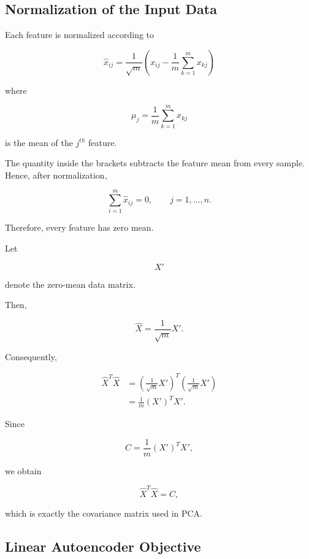 \documentclass{article}
\begin{document}
\subsection{Normalization of the Input Data}

Each feature is normalized according to

\[
\boxed{
	\hat{x}_{ij}
	=
	\frac{1}{\sqrt{m}}
	\left(
	x_{ij}
	-
	\frac1m
	\sum_{k=1}^{m}x_{kj}
	\right)
}
\]

where

\[
\mu_j
=
\frac1m
\sum_{k=1}^{m}x_{kj}
\]

is the mean of the $j^{th}$ feature.

The quantity inside the brackets subtracts the feature mean from every sample.
Hence, after normalization,

\[
\boxed{
	\sum_{i=1}^{m}\hat{x}_{ij}=0,
	\qquad
	j=1,\ldots,n.
}
\]

Therefore, every feature has zero mean.

Let

\[
X'
\]

denote the zero-mean data matrix.

Then,

\[
\boxed{
	\hat{X}
	=
	\frac1{\sqrt m}X'.
}
\]

Consequently,

\[
\begin{aligned}
	\hat{X}^{T}\hat{X}
	&=
	\left(\frac1{\sqrt m}X'\right)^T
	\left(\frac1{\sqrt m}X'\right)\\
	&=
	\frac1m(X')^TX'.
\end{aligned}
\]

Since

\[
\boxed{
	C=\frac1m(X')^TX',
}
\]

we obtain

\[
\boxed{
	\hat{X}^{T}\hat{X}=C,
}
\]

which is exactly the covariance matrix used in PCA.

\subsection{Linear Autoencoder Objective}
\end{document}
